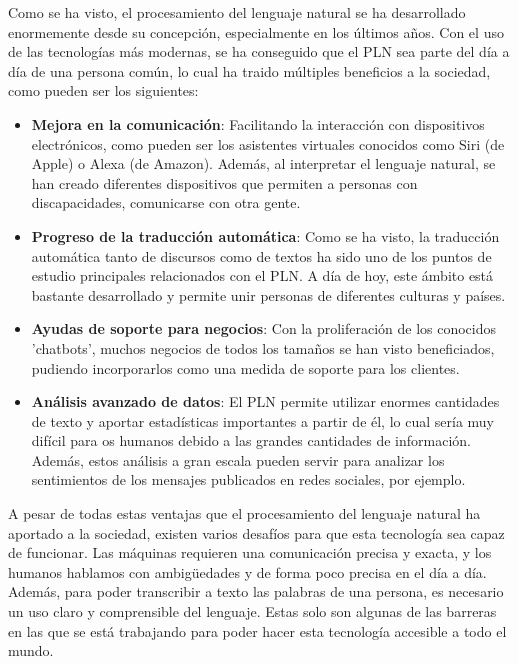 Como se ha visto, el procesamiento del lenguaje natural se ha desarrollado enormemente desde su concepción, especialmente en los últimos años. Con el uso de las tecnologías más modernas, se ha conseguido que el PLN sea parte del día a día de una persona común, lo cual ha traido múltiples beneficios a la sociedad, como pueden ser los siguientes:

\begin{itemize}
	\item \textbf{Mejora en la comunicación}: Facilitando la interacción con dispositivos electrónicos, como pueden ser los asistentes virtuales conocidos como Siri (de Apple) o Alexa (de Amazon). Además, al interpretar el lenguaje natural, se han creado diferentes dispositivos que permiten a personas con discapacidades, comunicarse con otra gente.
	
	\item \textbf{Progreso de la traducción automática}: Como se ha visto, la traducción automática tanto de discursos como de textos ha sido uno de los puntos de estudio principales relacionados con el PLN. A día de hoy, este ámbito está bastante desarrollado y permite unir personas de diferentes culturas y países.
	
	\item \textbf{Ayudas de soporte para negocios}: Con la proliferación de los conocidos 'chatbots', muchos negocios de todos los tamaños se han visto beneficiados, pudiendo incorporarlos como una medida de soporte para los clientes.
	
	\item \textbf{Análisis avanzado de datos}: El PLN permite utilizar enormes cantidades de texto y aportar estadísticas importantes a partir de él, lo cual sería muy difícil para os humanos debido a las grandes cantidades de información. Además, estos análisis a gran escala pueden servir para analizar los sentimientos de los mensajes publicados en redes sociales, por ejemplo.
\end{itemize}

A pesar de todas estas ventajas que el procesamiento del lenguaje natural ha aportado a la sociedad, existen varios desafíos para que esta tecnología sea capaz de funcionar. Las máquinas requieren una comunicación precisa y exacta, y los humanos hablamos con ambigüedades y de forma poco precisa en el día a día. Además, para poder transcribir a texto las palabras de una persona, es necesario un uso claro y comprensible del lenguaje. Estas solo son algunas de las barreras en las que se está trabajando para poder hacer esta tecnología accesible a todo el mundo.


